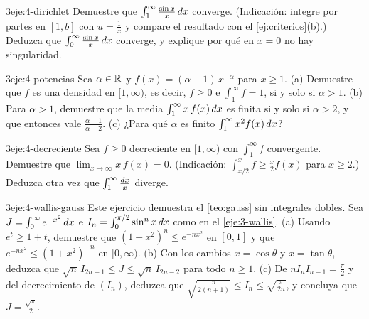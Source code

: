\begin{ejercicio}{3}{eje:4-dirichlet}
Demuestre que $\int_1^{\infty}\frac{\sin x}{x}\mathop{}\!d x$ converge. (Indicación: integre por partes en $[1,b]$ con $u=\frac1x$ y compare el resultado con el \cref{ej:criterios}(b).) Deduzca que $\int_0^{\infty}\frac{\sin x}{x}\mathop{}\!d x$ converge, y explique por qué en $x=0$ no hay singularidad.
\end{ejercicio}

\begin{ejercicio}{3}{eje:4-potencias}
Sea $\alpha\in\mathbb{R}$ y $f(x)=(\alpha-1)\,x^{-\alpha}$ para $x\ge1$. (a) Demuestre que $f$ es una densidad en $[1,\infty)$, es decir, $f\ge0$ e $\int_1^{\infty}f=1$, si y solo si $\alpha>1$. (b) Para $\alpha>1$, demuestre que la media $\int_1^{\infty}x\,f(x)\mathop{}\!d x$ es finita si y solo si $\alpha>2$, y que entonces vale $\frac{\alpha-1}{\alpha-2}$. (c) ¿Para qué $\alpha$ es finito $\int_1^{\infty}x^{2}f(x)\mathop{}\!d x$?
\end{ejercicio}

\begin{ejercicio}{3}{eje:4-decreciente}
Sea $f\ge0$ decreciente en $[1,\infty)$ con $\int_1^{\infty}f$ convergente. Demuestre que $\lim_{x\to\infty}x\,f(x)=0$. (Indicación: $\int_{x/2}^{x}f\ge\frac x2 f(x)$ para $x\ge2$.) Deduzca otra vez que $\int_1^{\infty}\frac{\mathop{}\!d x}{x}$ diverge.
\end{ejercicio}

\begin{ejercicio}{3}{eje:4-wallis-gauss}
Este ejercicio demuestra el \cref{teo:gauss} sin integrales dobles. Sea $J=\int_0^{\infty}e^{-x^{2}}\mathop{}\!d x$ e $I_n=\int_0^{\pi/2}\sin^{n}x\mathop{}\!d x$ como en el \cref{eje:3-wallis}.
(a) Usando $e^{t}\ge1+t$, demuestre que $(1-x^{2})^{n}\le e^{-nx^{2}}$ en $[0,1]$ y que $e^{-nx^{2}}\le(1+x^{2})^{-n}$ en $[0,\infty)$.
(b) Con los cambios $x=\cos\theta$ y $x=\tan\theta$, deduzca que $\sqrt n\,I_{2n+1}\le J\le\sqrt n\,I_{2n-2}$ para todo $n\ge1$.
(c) De $nI_nI_{n-1}=\frac\pi2$ y del decrecimiento de $(I_n)$, deduzca que $\sqrt{\frac{\pi}{2(n+1)}}\le I_n\le\sqrt{\frac{\pi}{2n}}$, y concluya que $J=\frac{\sqrt\pi}{2}$.
\end{ejercicio}
